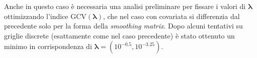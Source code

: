 \documentclass[a4paper,11pt,twoside,openright]{book}							%
\begin{document}
Anche in questo caso è necessaria una analisi preliminare per fissare i valori di $\bm \lambda$ ottimizzando l'indice $\mathrm{GCV}(\bm \lambda)$, che nel caso con covariata si differenzia dal precedente solo per la forma della \textit{smoothing matrix}. Dopo alcuni tentativi su griglie discrete (esattamente come nel caso precedente) è stato ottenuto un minimo in corrispondenza di $\bm \lambda = (10^{-0.5}, 10^{-3.25})$. 
\newpage
\begin{figure}[H]
\centering
{}
\end{figure}
\end{document}
